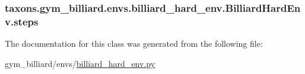 \subsubsection[{\texorpdfstring{steps}{steps}}]{\setlength{\rightskip}{0pt plus 5cm}taxons.\+gym\+\_\+billiard.\+envs.\+billiard\+\_\+hard\+\_\+env.\+Billiard\+Hard\+Env.\+steps}\hypertarget{classtaxons_1_1gym__billiard_1_1envs_1_1billiard__hard__env_1_1_billiard_hard_env_aafc9b80b6cfa4a2e6fd14716f337faf0}{}\label{classtaxons_1_1gym__billiard_1_1envs_1_1billiard__hard__env_1_1_billiard_hard_env_aafc9b80b6cfa4a2e6fd14716f337faf0}


The documentation for this class was generated from the following file\+:\begin{DoxyCompactItemize}
\item 
gym\+\_\+billiard/envs/\hyperlink{billiard__hard__env_8py}{billiard\+\_\+hard\+\_\+env.\+py}\end{DoxyCompactItemize}

